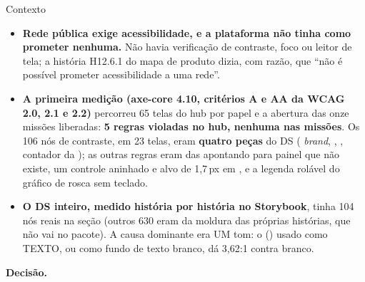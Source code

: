 \begin{especificacao}{Contexto}
\begin{itemize}
  \item \textbf{Rede pública exige acessibilidade, e a plataforma não tinha
    como prometer nenhuma.} Não havia verificação de contraste, foco ou leitor
    de tela; a história H12.6.1 do mapa de produto dizia, com razão, que
    \enquote{não é possível prometer acessibilidade a uma rede}.
  \item \textbf{A primeira medição (axe-core 4.10, critérios A e AA da WCAG
    2.0, 2.1 e 2.2)} percorreu 65 telas do hub por papel e a abertura das
    onze missões liberadas: \textbf{5 regras violadas no hub, nenhuma nas
    missões}. Os 106 nós de contraste, em 23 telas, eram \textbf{quatro peças}
    do DS ( \emph{brand}, , , contador da
    ); as outras regras eram  das  apontando
    para painel que não existe, um controle aninhado e alvo de 1,7\,px em
    , e a legenda rolável do gráfico de rosca sem
    teclado.
  \item \textbf{O DS inteiro, medido história por história no Storybook},
    tinha 104 nós reais na seção  (outros 630 eram da moldura das
    próprias histórias, que não vai no pacote). A causa dominante era UM tom:
    o  () usado como TEXTO, ou como fundo de
    texto branco, dá 3,62:1 contra branco.
\end{itemize}
\end{especificacao}

\textbf{Decisão.}

